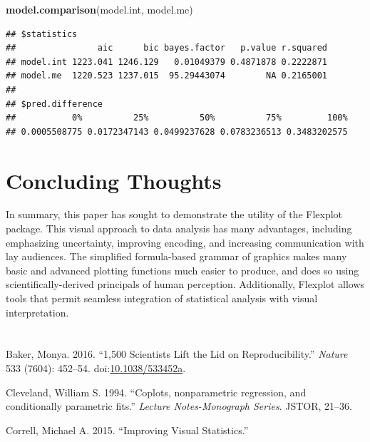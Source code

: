 \documentclass[,]{book}
\newenvironment{Shaded}{\begin{snugshade}}{\end{snugshade}}
\newcommand{\KeywordTok}[1]{\textcolor[rgb]{0.13,0.29,0.53}{\textbf{#1}}}
\newcommand{\NormalTok}[1]{#1}
\begin{document}
\begin{Shaded}
\begin{Highlighting}[]
\KeywordTok{model.comparison}\NormalTok{(model.int, model.me)}
\end{Highlighting}
\end{Shaded}

\begin{verbatim}
## $statistics
##                aic      bic bayes.factor   p.value r.squared
## model.int 1223.041 1246.129   0.01049379 0.4871878 0.2222871
## model.me  1220.523 1237.015  95.29443074        NA 0.2165001
## 
## $pred.difference
##           0%          25%          50%          75%         100% 
## 0.0005508775 0.0172347143 0.0499237628 0.0783236513 0.3483202575
\end{verbatim}

\chapter*{Concluding Thoughts}\label{concluding-thoughts}

In summary, this paper has sought to demonstrate the utility of the
Flexplot package. This visual approach to data analysis has many
advantages, including emphasizing uncertainty, improving encoding, and
increasing communication with lay audiences. The simplified
formula-based grammar of graphics makes many basic and advanced plotting
functions much easier to produce, and does so using
scientifically-derived principals of human perception. Additionally,
Flexplot allows tools that permit seamless integration of statistical
analysis with visual interpretation.

\chapter*{}\label{section}

\hypertarget{refs}{}
\hypertarget{ref-Baker2016a}{}
Baker, Monya. 2016. ``1,500 Scientists Lift the Lid on
Reproducibility.'' \emph{Nature} 533 (7604): 452--54.
doi:\href{https://doi.org/10.1038/533452a}{10.1038/533452a}.

\hypertarget{ref-Cleveland1994}{}
Cleveland, William S. 1994. ``Coplots, nonparametric regression, and
conditionally parametric fits.'' \emph{Lecture Notes-Monograph Series}.
JSTOR, 21--36.

\hypertarget{ref-Correll2015a}{}
Correll, Michael A. 2015. ``Improving Visual Statistics.''
\end{document}
